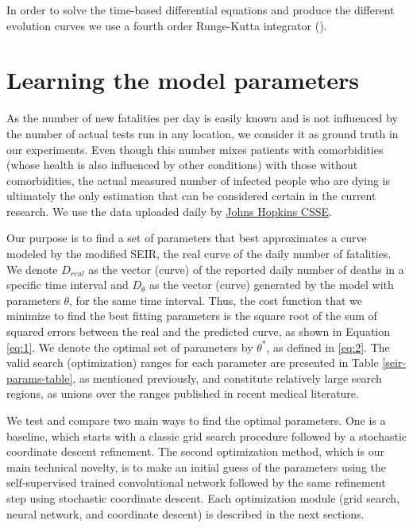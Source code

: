\documentclass[11pt]{article}
\begin{document}
In order to solve the time-based differential equations and produce the different evolution curves
we use a fourth order Runge-Kutta integrator (\cite{Tan2012}).

\section{Learning the model parameters} 
\label{sec:error-minim}

As the number of new fatalities per day is easily known and is not influenced by the number of actual tests run in any location, we consider it as ground truth in our experiments. Even though this number mixes patients with comorbidities 
(whose health is also influenced by other conditions) with those without comorbidities, the actual measured number of infected people who are dying is ultimately the only estimation that can be considered certain in the current research. We use the data uploaded daily by \href{https://github.com/CSSEGISandData/COVID-19/tree/master/csse_covid_19_data/csse_covid_19_daily_reports}{Johns Hopkins CSSE}.

Our purpose is to find a set of parameters that best approximates a curve modeled by the modified SEIR, the real curve of the daily number of fatalities. We denote $D_{real}$ as the vector (curve) of the reported daily number of deaths in a specific time interval and $D_{\theta}$ as the vector (curve) generated by the model with parameters $\theta$, for the same time interval. Thus, the cost function that we minimize to find the best fitting parameters is the square root of the sum of squared errors between the real and the predicted curve, as shown in Equation \eqref{eq:1}. We denote the optimal set of parameters by $\theta^*$, as defined in \eqref{eq:2}. The valid search (optimization) ranges for each parameter are presented in Table \ref{seir-params-table}, as mentioned previously, and constitute relatively large search regions, as unions over the ranges published in recent medical literature.

We test and compare two main ways to find the optimal parameters. One is a baseline, which starts with a classic grid search procedure followed by a stochastic coordinate descent refinement. The second optimization method, which is our main technical novelty, is to make an initial guess of the parameters using the self-supervised trained convolutional network followed by the same refinement step using stochastic coordinate descent. Each optimization module (grid search, neural network, and coordinate descent) is described in the next sections.
\end{document}
